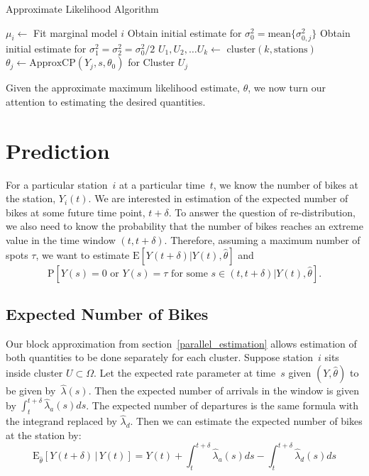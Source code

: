 \documentclass{acm_proc_article-sp}
\begin{document}
\begin{algorithm}[!h]
\caption{Approximate Likelihood Algorithm} \label{applik_alg}
\begin{algorithmic}
\STATE $\mu_i \gets$ Fit marginal model $i$ 
\ENDFOR
\STATE Obtain initial estimate for $\sigma_0^2 = \text{mean} \{ \sigma_{0,j}^2\}$
\STATE Obtain initial estimate for $\sigma_1^2 = \sigma_2^2 = \sigma_0^2 / 2$
\STATE $U_1, U_2, \ldots U_k \gets$ cluster$(k, \text{stations})$
\STATE $\theta_j \gets \text{ApproxCP} (Y_j, s, \theta_0)$ for Cluster $U_j$
\ENDFOR
\end{algorithmic}
\end{algorithm}

Given the approximate maximum likelihood estimate, $\theta$, we now turn our attention to estimating the desired quantities.

\section{Prediction}

For a particular station~$i$ at a particular time~$t$, we know the number of bikes at the station, $Y_i(t)$.  We are interested in estimation of the expected number of bikes at some future time point, $t+\delta$.  To answer the question of re-distribution, we also need to know the probability that the number of bikes reaches an extreme value in the time window $(t, t+\delta)$.  Therefore, assuming a maximum number of spots $\tau$, we want to estimate $\text{E} \left[ Y(t+ \delta) | Y(t) , \hat{\theta} \right]$ and 
\begin{equation*}
\text{P} [ Y(s) = 0 \text{ or } Y(s) = \tau \text{ for some } s \in (t, t+\delta) | Y(t), \hat{\theta} ].  
\end{equation*}

\subsection{Expected Number of Bikes}
Our block approximation from section~\ref{parallel_estimation} allows estimation of both quantities to be done separately for each cluster.  Suppose station~$i$ sits inside cluster $U \subset \Omega$.  Let the expected rate parameter at time~$s$ given $(Y,\hat{\theta})$ to be given by~$\hat{\lambda} (s)$.  Then the expected number of arrivals in the window is given by $\int_{t}^{t+\delta} \hat{\lambda}_a (s) ds$.  The expected number of departures is the same formula with the integrand replaced by $\hat{\lambda}_d$.  Then we can estimate the expected number of bikes at the station by:
\begin{equation*}
\text{E}_{\hat{\theta}} \left[ Y(t+ \delta) \, | \, Y(t) \right] = Y(t) + \int_{t}^{t+\delta} \hat{\lambda}_a (s) ds - \int_{t}^{t+\delta} \hat{\lambda}_d (s) ds
\end{equation*}
\end{document}
